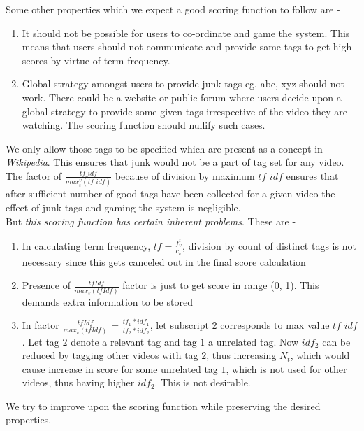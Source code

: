 \documentclass[12pt]{report}
\begin{document}
Some other properties which we expect a good scoring function to follow are -
\begin{enumerate}
\item It should not be possible for users to co-ordinate and game the system. This means that users should not communicate and provide same tags to get high scores by virtue of term frequency.
\item Global strategy amongst users to provide junk tags eg. abc, xyz should not work. There could be a website or public forum where users decide upon a global strategy to provide some given tags irrespective of the video they are watching. The scoring function should nullify such cases.
\end{enumerate}
We only allow those tags to be specified which are present as a concept in \emph{Wikipedia}. This ensures that junk would not be a part of tag set for any video. The factor of $\frac{tf\_idf}{max_t^v(tf\_idf)}$ because of division by maximum $tf\_idf$ ensures that after sufficient number of good tags have been collected for a given video the effect of junk tags and gaming the system is negligible.
\vspace{1em}\\
But \emph{this scoring function has certain inherent problems}. These are - 
\begin{enumerate}
\item In calculating term frequency, $tf=\frac{f_v^t}{c_v}$, division by count of distinct tags is not necessary since this gets canceled out in the final score calculation
\item Presence of $\frac{tfIdf}{max_v(tfIdf)}$ factor is just to get score in range (0, 1). This demands extra information to be stored
\item In factor $\frac{tfIdf}{max_v(tfIdf)}$ = $\frac{tf_1*idf_1}{tf_2*idf_2}$, let subscript 2 corresponds to max value $tf\_idf$. Let tag $2$ denote a relevant tag and tag $1$ a unrelated tag. Now $idf_2$ can be reduced by tagging other videos with tag $2$, thus increasing $N_t$, which would cause increase in score for some unrelated tag $1$, which is not used for other videos, thus having higher $idf_2$. This is not desirable.
\end{enumerate}
\vspace{2em}

We try to improve upon the scoring function while preserving the desired properties.
\pagebreak
\end{document}
